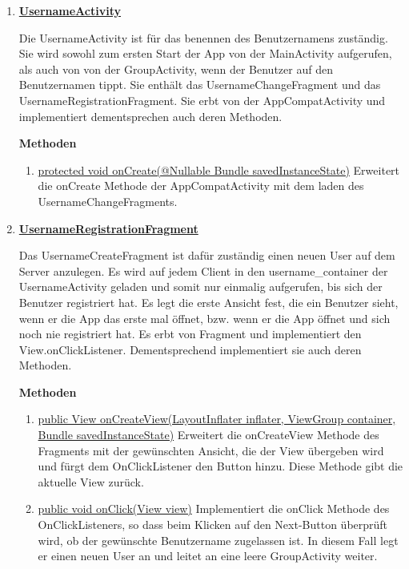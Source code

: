 \begin{enumerate}
	\item \textbf{\underline{UsernameActivity}}
	
	Die UsernameActivity ist für das benennen des Benutzernamens zuständig. Sie wird sowohl zum ersten Start der App von der MainActivity aufgerufen, als auch von von der GroupActivity, wenn der Benutzer auf den Benutzernamen tippt. Sie enthält das UsernameChangeFragment und das UsernameRegistrationFragment. Sie erbt von der AppCompatActivity und implementiert dementsprechen auch deren Methoden.
	
	\textbf{Methoden}
	
	\begin{enumerate}
		\item \underline{protected void onCreate(@Nullable Bundle savedInstanceState)}
		Erweitert die onCreate Methode der AppCompatActivity mit dem laden des UsernameChangeFragments.
	\end{enumerate}
	
	\item \textbf{\underline{UsernameRegistrationFragment}}
	
	Das UsernameCreateFragment ist dafür zuständig einen neuen User auf dem Server anzulegen. Es wird auf jedem Client in den username\_container der UsernameActivity geladen und somit nur einmalig aufgerufen, bis sich der Benutzer registriert hat. Es legt die erste Ansicht fest, die ein Benutzer sieht, wenn er die App das erste mal öffnet, bzw. wenn er die App öffnet und sich noch nie registriert hat. Es erbt von Fragment und implementiert den View.onClickListener. Dementsprechend implementiert sie auch deren Methoden.
	
	\textbf{Methoden}
	
	\begin{enumerate}
		\item \underline{public View onCreateView(LayoutInflater inflater, ViewGroup container, Bundle savedInstanceState)}
		Erweitert die onCreateView Methode des Fragments mit der gewünschten Ansicht, die der View übergeben wird und fürgt dem OnClickListener den Button hinzu. Diese Methode gibt die aktuelle View zurück.
		\item \underline{public void onClick(View view)}
		Implementiert die onClick Methode des OnClickListeners, so dass beim Klicken auf den Next-Button überprüft wird, ob der gewünschte Benutzername zugelassen ist. In diesem Fall legt er einen neuen User an und leitet an eine leere GroupActivity weiter.
	\end{enumerate}


\end{enumerate}
